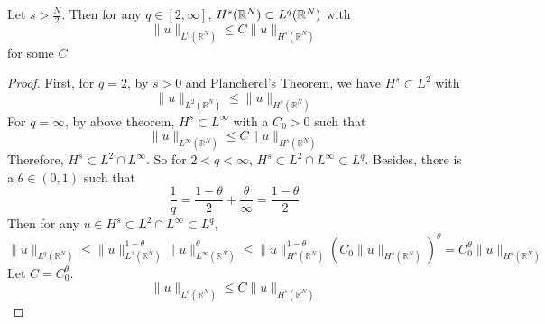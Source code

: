 \begin{cor}
	Let $s > \frac{N}{2}$. Then for any $q \in [2,\infty]$, $H^s(\mathbb{R}^N) \subset L^q(\mathbb{R}^N)$ with
	\begin{equation*}
		\|u\|_{L^{q}\left(\mathbb{R}^N\right)} \leq C\|u\|_{H^s\left(\mathbb{R}^N\right)}
	\end{equation*}
	for some $C$.
\end{cor}
\begin{proof}
	First, for $q=2$, by $s > 0$ and Plancherel's Theorem, we have $H^s \subset L^2$ with
	\begin{equation*}
		\|u\|_{L^2\left(\mathbb{R}^N\right)} \leq\|u\|_{H^s\left(\mathbb{R}^N\right)}
	\end{equation*}
	For $q=\infty$, by above theorem, $H^s \subset L^\infty$ with a $C_0 > 0$ such that
	\begin{equation*}
		\|u\|_{L^{\infty}\left(\mathbb{R}^N\right)} \leq C\|u\|_{H^s\left(\mathbb{R}^N\right)}
	\end{equation*}
	Therefore, $H^s \subset L^2 \cap L^\infty$. So for $2 < q < \infty$, $H^s \subset L^2 \cap L^\infty \subset L^q$. Besides, there is a $\theta \in (0,1)$ such that
	\begin{equation*}
		\frac{1}{q}=\frac{1-\theta}{2}+\frac{\theta}{\infty}=\frac{1-\theta}{2}
	\end{equation*}
	Then for any $u \in H^s \subset L^2 \cap L^\infty \subset L^q$,
	\begin{equation*}
		\|u\|_{L^q\left(\mathbb{R}^N\right)} \leq\|u\|_{L^2\left(\mathbb{R}^N\right)}^{1-\theta}\|u\|_{L^{\infty}\left(\mathbb{R}^N\right)}^\theta \leq\|u\|_{H^s\left(\mathbb{R}^N\right)}^{1-\theta}\left(C_0\|u\|_{H^s\left(\mathbb{R}^N\right)}\right)^\theta=C_0^\theta\|u\|_{H^s\left(\mathbb{R}^N\right)}
	\end{equation*}
	Let $C = C_0^\theta$.
	\begin{equation*}
		\|u\|_{L^{q}\left(\mathbb{R}^N\right)} \leq C\|u\|_{H^s\left(\mathbb{R}^N\right)}
	\end{equation*}
\end{proof}

